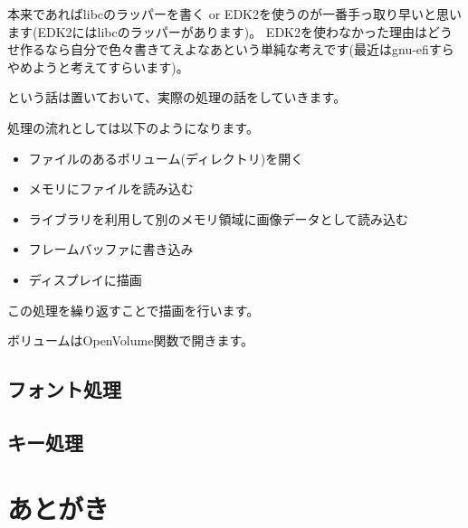 \documentclass[10pt, b5paper, openany]{ltjsbook}
\begin{document}
本来であればlibcのラッパーを書く or EDK2を使うのが一番手っ取り早いと思います(EDK2にはlibcのラッパーがあります)。
EDK2を使わなかった理由はどうせ作るなら自分で色々書きてえよなあという単純な考えです(最近はgnu-efiすらやめようと考えてすらいます)。

という話は置いておいて、実際の処理の話をしていきます。

処理の流れとしては以下のようになります。
\begin{itemize}
    \item ファイルのあるボリューム(ディレクトリ)を開く
    \item メモリにファイルを読み込む
    \item ライブラリを利用して別のメモリ領域に画像データとして読み込む
    \item フレームバッファに書き込み
    \item ディスプレイに描画
\end{itemize}
この処理を繰り返すことで描画を行います。

ボリュームはOpenVolume関数で開きます。

\section{フォント処理}

\section{キー処理}

\chapter{あとがき}
\end{document}
